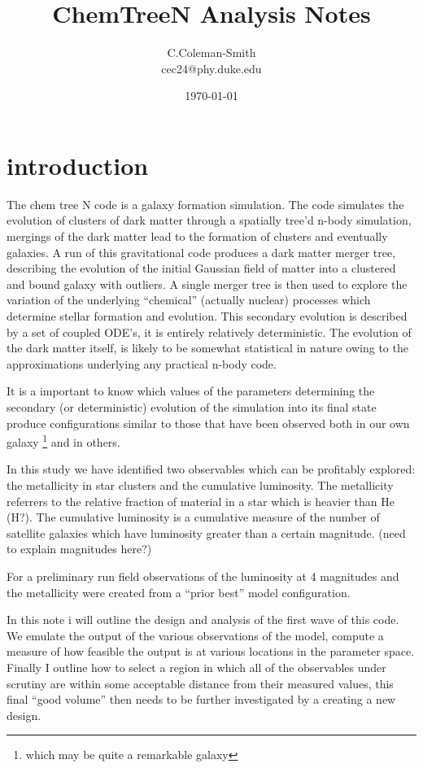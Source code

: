 \documentclass[11pt]{article}
\begin{document}
\title{ChemTreeN Analysis Notes}
\author{C.Coleman-Smith\\ cec24@phy.duke.edu}
\date{\today}
\maketitle

\section{introduction}

The chem tree N code is a galaxy formation simulation. The code simulates the evolution of clusters of dark matter through a spatially tree'd n-body simulation, mergings of the dark matter lead to the formation of clusters and eventually galaxies. A run of this gravitational code produces a dark matter merger tree, describing the evolution of the initial Gaussian field of matter into a  clustered and bound galaxy with outliers. A single merger tree is then used to explore the variation of the underlying ``chemical'' (actually nuclear) processes which determine stellar formation and evolution. This secondary evolution is described by a set of coupled ODE's, it is entirely relatively deterministic. The evolution of the dark matter itself, is likely to be somewhat statistical in nature owing to the approximations underlying any practical n-body code. 

It is a important to know which values of the parameters determining the secondary (or deterministic) evolution of the simulation into its final state produce configurations similar to those that have been observed both in our own galaxy \footnote{which may be quite a remarkable galaxy} and in others. 

In this study we have identified two observables which can be profitably explored: the metallicity in star clusters and the cumulative luminosity. The metallicity referrers to the relative fraction of material in a star which is heavier than He (H?). The cumulative luminosity is a cumulative measure of the number of satellite galaxies which have luminosity greater than a certain magnitude. (need to explain magnitudes here?)

For a preliminary run field observations of the luminosity at 4 magnitudes and the metallicity were created from a ``prior best'' model configuration. 

In this note i will outline the design and analysis of the first wave of this code. We emulate the output of the various observations of the model, compute a measure of how feasible the output is at various locations in the parameter space. Finally I outline how to select a region in which all of the observables under scrutiny are within some acceptable distance from their measured values, this final ``good volume'' then needs to be further investigated by a creating a new design. 
\end{document}
